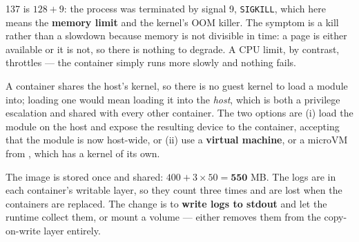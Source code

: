 \begin{ans}
  \item 137 is $128 + 9$: the process was terminated by signal 9, \texttt{SIGKILL},
        which here means the \textbf{memory limit} and the kernel's OOM killer.
        The symptom is a kill rather than a slowdown because memory is not
        divisible in time: a page is either available or it is not, so there is
        nothing to degrade. A CPU limit, by contrast, throttles --- the container
        simply runs more slowly and nothing fails.
  \item A container shares the host's kernel, so there is no guest kernel to
        load a module into; loading one would mean loading it into the
        \emph{host}, which is both a privilege escalation and shared with every
        other container. The two options are (i) load the module on the host and
        expose the resulting device to the container, accepting that the module
        is now host-wide, or (ii) use a \textbf{virtual machine}, or a microVM
        from , which has a kernel of its own.
  \item The image is stored once and shared: $400 + 3 \times 50 =
        \mathbf{550}$ MB. The logs are in each container's writable layer, so
        they count three times and are lost when the containers are replaced.
        The change is to \textbf{write logs to stdout} and let the runtime
        collect them, or mount a volume --- either removes them from the
        copy-on-write layer entirely.
\end{ans}

